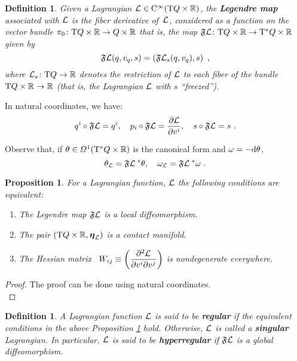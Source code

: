 \documentclass[12pt]{report}
\newtheorem{prop}[teor]{Proposition}
\newtheorem{definition}[teor]{Definition}
\def\dst{\displaystyle}
\def\derpar#1#2{\frac{\partial{#1}}{\partial{#2}}}
\def\qed{\ifvmode\removelastskip\fi
{\unskip\nobreak\hfil\penalty50\hbox{}\nobreak\hfil
\hbox{\vrule height1.2ex width1.2ex}\parfillskip=0pt
\finalhyphendemerits=0 \par\smallskip}}
\def\df{{\mit\Omega}}
\def\Lag{{\cal L}}
\def\d{{\rm d}}
\def\Real{\mathbb{R}}
\def\bmeta{\mbox{\boldmath $\eta$}}
\def\Tan{{\rm T}}
\def\Cinfty{{\rm C}^\infty}
\begin{document}
\begin{definition}
\label{legmap1}
Given a Lagrangian 
$\Lag\in\Cinfty(\Tan Q\times\Real)$, the {\sl \textbf{Legendre map}}
associated with $\Lag$ is the fiber derivative of~$\Lag$,
considered as a function on the vector bundle
$\pi_0 \colon\Tan Q\times\Real\to Q\times\Real$
that is, the map
$\mathfrak{F}\Lag\colon\Tan Q\times\Real \to\Tan^*Q\times\Real$ 
given by
$$
\mathfrak{F}\Lag (q,v_q,s) = \left(\mathfrak{F}\Lag_s (q,v_q),s\right)
\ ,
$$
where $\Lag_s\colon\Tan Q\to\Real$ denotes the restriction of $\Lag$ to each fiber of the bundle $\Tan Q\times\Real\to\Real$
(that is, the Lagrangian $\Lag$ with $s$ ``freezed'').
\end{definition}

In natural coordinates, we have:
$$
q^i \circ \mathfrak{F}\Lag = q^i ,\quad p_i \circ \mathfrak{F}\Lag =\derpar{\Lag}{v^i} ,\quad s \circ \mathfrak{F}\Lag = s \ .
$$

Observe that, if $\theta\in\df^1(\Tan^*Q\times\Real)$ 
is the canonical form and $\omega=-\d\theta$, 
$$
\theta_\Lag=\mathfrak{F}\Lag^{\;*}\theta,\quad\omega_\Lag=\mathfrak{F}\Lag^{\;*}\omega\ .
$$

\begin{prop}
\label{Prop-regLag}
For a Lagrangian function, $\Lag$ the following conditions are equivalent:
\begin{enumerate}
\item
The Legendre map
$\mathfrak{F}\Lag$ is a local diffeomorphism.
\item 
The pair $(\Tan Q\times\Real,\bmeta_\Lag)$ is a contact manifold.
\item 
The Hessian matrix \ $\dst W_{ij}\equiv\left(\frac{\partial^2\Lag}{\partial v^i\partial v^j}\right)$ is nondegenerate everywhere.
\end{enumerate}
\end{prop}
\begin{proof}
The proof can be done using natural coordinates.
\\ \qed\end{proof}

\begin{definition}
A Lagrangian function $\Lag$ is said to be {\sl\textbf{regular}} if the equivalent
conditions in the above Proposition \ref{Prop-regLag} hold.
Otherwise, $\Lag$ is called a {\sl\textbf{singular}} Lagrangian.
In particular, 
$\Lag$ is said to be {\sl\textbf{hyperregular}} 
if $\mathfrak{F}\Lag$ is a global diffeomorphism.
\end{definition}
\end{document}
